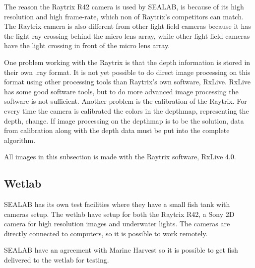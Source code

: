 The reason the Raytrix R42 camera is used by SEALAB, is because of its high resolution and high frame-rate, which non of Raytrix's competitors can match. The Raytrix camera is also different from other light field cameras because it has the light ray crossing behind the micro lens array, while other light field cameras have the light crossing in front of the micro lens array.

One problem working with the Raytrix is that the depth information is stored in their own .ray format. It is not yet possible to do direct image processing on this format using other processing tools than Raytrix's own software, RxLive. RxLive has some good software tools, but to do more advanced image processing the software is not sufficient.
Another problem is the calibration of the Raytrix. For every time the camera is calibrated the colors in the depthmap, representing the depth, change. If image processing on the depthmap is to be the solution, data from calibration along with the depth data must be put into the complete algorithm. 

All images in this subsection is made with the Raytrix software, RxLive 4.0.




\subsection{Wetlab}\label{wetlab}

SEALAB has its own test facilities where they have a small fish tank with cameras setup. The wetlab have setup for both the Raytrix R42, a Sony 2D camera for high resolution images and underwater lights. The cameras are directly connected to computers, so it is possible to work remotely.

SEALAB have an agreement with Marine Harvest so it is possible to get fish delivered to the wetlab for testing.

